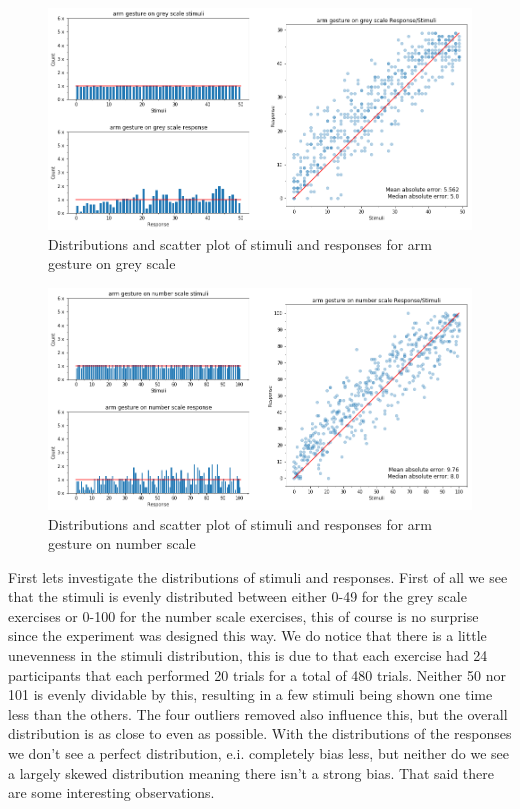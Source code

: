 \begin{figure}[p]
    \centering
    \includegraphics[width=1.2\textwidth]{figures/dist_scatter5.png}
    \caption{Distributions and scatter plot of stimuli and responses for arm gesture on grey scale}
    \label{dist_scatter5}
\end{figure}

\begin{figure}[p]
    \centering
    \includegraphics[width=1.2\textwidth]{figures/dist_scatter6.png}
    \caption{Distributions and scatter plot of stimuli and responses for arm gesture on number scale}
    \label{dist_scatter6}
\end{figure}

First lets investigate the distributions of stimuli and responses. First of all we see that the stimuli is evenly distributed between either 0-49 for the grey scale exercises or 0-100 for the number scale exercises, this of course is no surprise since the experiment was designed this way. We do notice that there is a little unevenness in the stimuli distribution, this is due to that each exercise had 24 participants that each performed 20 trials for a total of 480 trials. Neither 50 nor 101 is evenly dividable by this, resulting in a few stimuli being shown one time less than the others. The four outliers removed also influence this, but the overall distribution is as close to even as possible. With the distributions of the responses we don't see a perfect distribution, e.i. completely bias less, but neither do we see a largely skewed distribution meaning there isn't a strong bias. That said there are some interesting observations.

